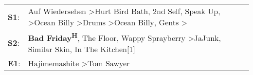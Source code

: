\begin{supertabular}{p{0.03\textwidth}p{0.92\textwidth}}
 \textbf{S1}:  &  Auf Wiedersehen\textsuperscript{} \textgreater \enspace Hurt Bird Bath\textsuperscript{}, \enspace 2nd Self\textsuperscript{}, \enspace Speak Up\textsuperscript{}, \textsuperscript{} \textgreater \enspace Ocean Billy\textsuperscript{} \textgreater \enspace Drums\textsuperscript{} \textgreater \enspace Ocean Billy\textsuperscript{}, \enspace Gents\textsuperscript{} \textgreater {}\textsuperscript{}  \enspace  \\
 \textbf{S2}:  &                                                                                                                                                                           \textbf{Bad Friday\textsuperscript{H}}, \enspace The Floor\textsuperscript{}, \enspace Wappy Sprayberry\textsuperscript{} \textgreater \enspace JaJunk\textsuperscript{}, \enspace Similar Skin\textsuperscript{}, \enspace In The Kitchen[1]\textsuperscript{}  \enspace  \\
 \textbf{E1}:  &                                                                                                                                                                                                                                                                                                                                                        Hajimemashite\textsuperscript{} \textgreater \enspace Tom Sawyer\textsuperscript{}  \enspace  \\
\end{supertabular}
